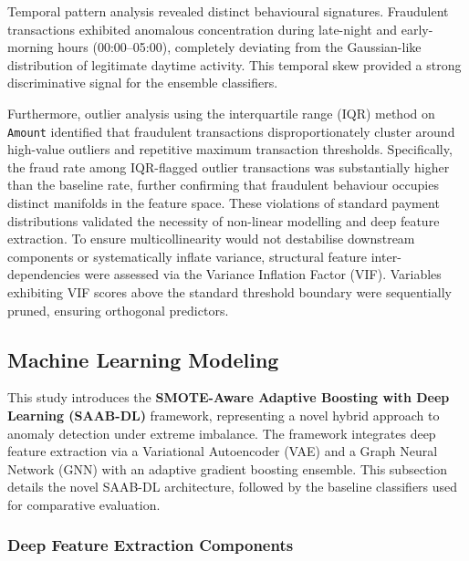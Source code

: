 \documentclass[a4paper,fleqn]{cas-sc}
\begin{document}
Temporal pattern analysis revealed distinct behavioural signatures. Fraudulent transactions exhibited anomalous concentration during late-night and early-morning hours (00:00--05:00), completely deviating from the Gaussian-like distribution of legitimate daytime activity. This temporal skew provided a strong discriminative signal for the ensemble classifiers.

Furthermore, outlier analysis using the interquartile range (IQR) method on \texttt{Amount} identified that fraudulent transactions disproportionately cluster around high-value outliers and repetitive maximum transaction thresholds. Specifically, the fraud rate among IQR-flagged outlier transactions was substantially higher than the baseline rate, further confirming that fraudulent behaviour occupies distinct manifolds in the feature space. These violations of standard payment distributions validated the necessity of non-linear modelling and deep feature extraction. To ensure multicollinearity would not destabilise downstream components or systematically inflate variance, structural feature inter-dependencies were assessed via the Variance Inflation Factor (VIF). Variables exhibiting VIF scores above the standard threshold boundary were sequentially pruned, ensuring orthogonal predictors.

\subsection{Machine Learning Modeling}

This study introduces the \textbf{SMOTE-Aware Adaptive Boosting with Deep Learning (SAAB-DL)} framework, representing a novel hybrid approach to anomaly detection under extreme imbalance. The framework integrates deep feature extraction via a Variational Autoencoder (VAE) and a Graph Neural Network (GNN) with an adaptive gradient boosting ensemble. This subsection details the novel SAAB-DL architecture, followed by the baseline classifiers used for comparative evaluation.

\subsubsection{Deep Feature Extraction Components}
\end{document}
